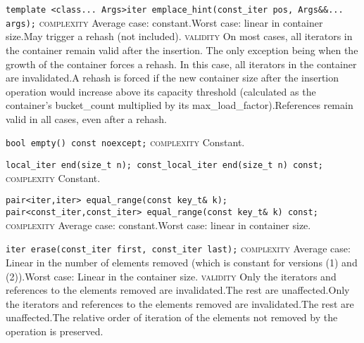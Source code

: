 \noindent{}\hspace*{0.25em}\lstinline[basicstyle=\ttfamily\color{corange}]{template <class... Args>iter emplace_hint(const_iter pos, Args&&... args);} \textsc{complexity} Average case: constant.Worst case: linear in container size.May trigger a rehash (not included). \textsc{validity} On most cases, all iterators in the container remain valid after the insertion. The only exception being when the growth of the container forces a rehash. In this case, all iterators in the container are invalidated.A rehash is forced if the new container size after the insertion operation would increase above its capacity threshold (calculated as the container's bucket\_count multiplied by its max\_load\_factor).References remain valid in all cases, even after a rehash.\\\vspace{-0.6em}

\noindent{}\hspace*{0.25em}\lstinline[basicstyle=\ttfamily\color{cgreen}]{bool empty() const noexcept;} \textsc{complexity} Constant.\\\vspace{-0.6em}

\noindent{}\hspace*{0.25em}\lstinline[basicstyle=\ttfamily\color{cgreen}]{local_iter end(size_t n); const_local_iter end(size_t n) const;} \textsc{complexity} Constant.\\\vspace{-0.6em}

\noindent{}\hspace*{0.25em}\lstinline[basicstyle=\ttfamily\color{corange}]{pair<iter,iter> equal_range(const key_t& k); pair<const_iter,const_iter> equal_range(const key_t& k) const;} \textsc{complexity} Average case: constant.Worst case: linear in container size.\\\vspace{-0.6em}

\noindent{}\hspace*{0.25em}\lstinline[basicstyle=\ttfamily\color{corange}]{iter erase(const_iter first, const_iter last);} \textsc{complexity} Average case: Linear in the number of elements removed (which is constant for versions (1) and (2)).Worst case: Linear in the container size. \textsc{validity} Only the iterators and references to the elements removed are invalidated.The rest are unaffected.Only the iterators and references to the elements removed are invalidated.The rest are unaffected.The relative order of iteration of the elements not removed by the operation is preserved.\\\vspace{-0.6em}

